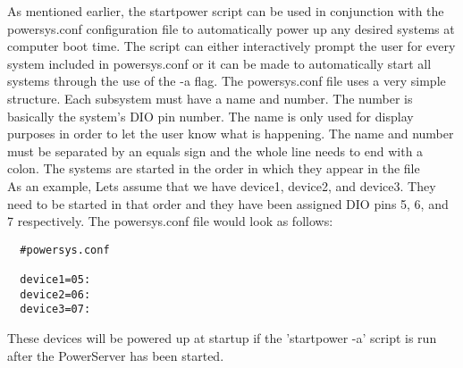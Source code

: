 As mentioned earlier, the startpower script can be used in conjunction with the powersys.conf configuration
file to automatically power up any desired systems at computer boot time. The script can either interactively
prompt the user for every system included in powersys.conf or it can be made to automatically start all systems
through the use of the -a flag. The powersys.conf file uses a very simple structure. Each subsystem must have a
name and number. The number is basically the system's DIO pin number. The name is only used for display purposes
in order to let the user know what is happening. The name and number must be separated by an equals sign and the
whole line needs to end with a colon. The systems are started in the order in which they appear in the file\\
\newline
As an example, Lets assume that we have device1, device2, and device3. They need to be started in that order and
they have been assigned DIO pins 5, 6, and 7 respectively. The powersys.conf file would look as follows:
\begin{verbatim}
  #powersys.conf

  device1=05:
  device2=06:
  device3=07:

\end{verbatim}
These devices will be powered up at startup if the 'startpower -a' script is run after the PowerServer
has been started.

%

